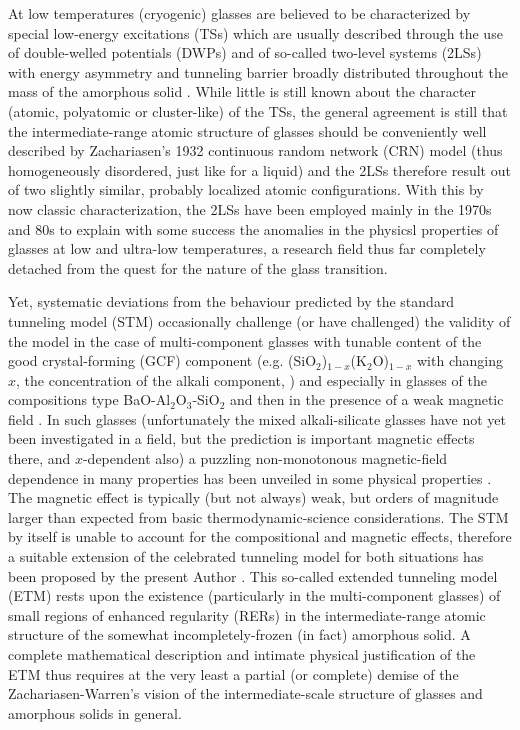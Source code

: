 \documentclass[10pt]{article}
\begin{document}
At low temperatures (cryogenic) glasses are believed to be characterized by special
low-energy excitations (TSs) which are usually described through the use of 
double-welled potentials (DWPs) and of so-called two-level systems (2LSs) with 
energy asymmetry and tunneling barrier broadly distributed throughout the mass of 
the amorphous solid \cite{Phi1981,Esq1998}. While little is still known about the 
character (atomic, polyatomic or cluster-like) of the TSs, the general agreement 
is still that the intermediate-range atomic structure of glasses should be conveniently 
well described by Zachariasen's 1932 continuous random network (CRN) model 
\cite{Zac1932,War1934} (thus homogeneously disordered, just like for a liquid) and 
the 2LSs therefore result out of two slightly similar, probably localized atomic 
configurations. 
With this by now classic characterization, the 2LSs have been employed mainly in the 
1970s and 80s to explain with some success the anomalies in the physicsl properties 
of glasses at low and ultra-low temperatures, a research field thus far completely 
detached from the quest for the nature of the glass transition.
     
Yet, systematic deviations from the behaviour predicted by the standard tunneling 
model (STM) occasionally challenge (or have challenged) the validity of the model in 
the case of multi-component glasses with tunable content of the good crystal-forming 
(GCF) component (e.g. (SiO$_2$)$_{1-x}$(K$_2$O)$_{1-x}$ with changing $x$, the 
concentration of the alkali component, \cite{Mac1985,Jug2010}) and especially in 
glasses of the compositions type BaO-Al$_2$O$_3$-SiO$_2$ and then in the 
presence of a weak magnetic field \cite{Ens2002}. In such glasses (unfortunately
the mixed alkali-silicate glasses have not yet been investigated in a field, but the 
prediction is important magnetic effects there, and $x$-dependent also) a puzzling 
non-monotonous magnetic-field dependence in many properties has been unveiled in 
some physical properties \cite{Str2000,Woh2001,Nag2004}. The magnetic effect is 
typically (but not always) weak, but orders of magnitude larger than expected from 
basic thermodynamic-science considerations. The STM by itself is unable to account 
for the compositional and magnetic effects, therefore a suitable extension of the 
celebrated tunneling model for both situations has been proposed by the present 
Author \cite{Jug2004}. This so-called extended tunneling model (ETM) rests upon 
the existence (particularly in the multi-component glasses) of small regions of 
enhanced regularity (RERs) in the intermediate-range atomic structure of the 
somewhat incompletely-frozen (in fact) amorphous solid. A complete mathematical 
description and intimate physical justification of the ETM thus requires at the very 
least a partial (or complete) demise of the Zachariasen-Warren's vision of the 
intermediate-scale structure of glasses and amorphous solids in general.    
\end{document}
